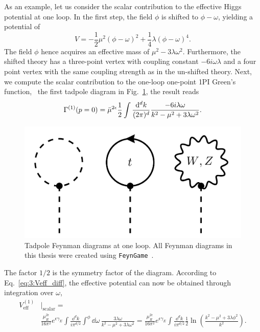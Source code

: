 As an example, let us consider the scalar contribution to the effective Higgs potential at one loop. In the first step, the field $\phi$ is shifted to $\phi - \omega$, yielding a potential of
\begin{equation}
V = -\frac{1}{2} \mu^2 (\phi - \omega)^2 + \frac{1}{4} \lambda (\phi - \omega)^4.
\end{equation}
The field $\phi$ hence acquires an effective mass of $\mu^2 - 3 \lambda \omega^2$. Furthermore, the shifted theory has a three-point vertex with coupling constant $- 6i\omega \lambda$ and a four point vertex with the same coupling strength as in the un-shifted theory. Next, we compute the scalar contribution to the one-loop one-point \acs{1PI} Green's function, \ie\ the first tadpole diagram in Fig.~\ref{fig:3:tadpoles}, the result reads
\begin{equation}
\Gamma^{(1)} (p = 0) = \bar{\mu}^{2 \epsilon} \frac{1}{2} \int \frac{\mathrm{d}^d k}{(2 \pi)^d} \frac{-6i \lambda \omega}{k^2 - \mu^2 + 3 \lambda \omega^2}.
\end{equation}
\begin{figure}[h]
\centering
\includegraphics[scale=0.25]{Images/tadpoles.pdf}
\caption{Tadpole Feynman diagrams at one loop. All Feynman diagrams in this thesis were created using \texttt{FeynGame}~\cite{Harlander:2020cyh, Harlander:2024qbn, Bundgen:2025utt}.}
\label{fig:3:tadpoles}
\end{figure}
The factor $1/2$ is the symmetry factor of the diagram. According to Eq.~\eqref{eq:3:Veff_diff}, the effective potential can now be obtained through integration over $\omega$,
\begin{equation}
\begin{split}
V_\text{eff}^{(1)} &\big \vert_{\text{scalar}} =  \\
&\frac{\mu_R^{2 \epsilon}}{16 \pi^2} e^{\epsilon \gamma_E} \int \frac{\dd^d k}{i \pi^{d/2}} \int^{\phi} \dd \omega\, \frac{3 \lambda \omega}{k^2 - \mu^2 + 3 \lambda \omega^2} = \frac{\mu_R^{2 \epsilon}}{16 \pi^2} e^{\epsilon \gamma_E} \int \frac{\dd^d k}{i \pi^{d/2}} \frac{1}{2} \ln\! \left( \frac{k^2 - \mu^2 + 3 \lambda \phi^2}{k^2} \right).
\end{split}
\end{equation}
